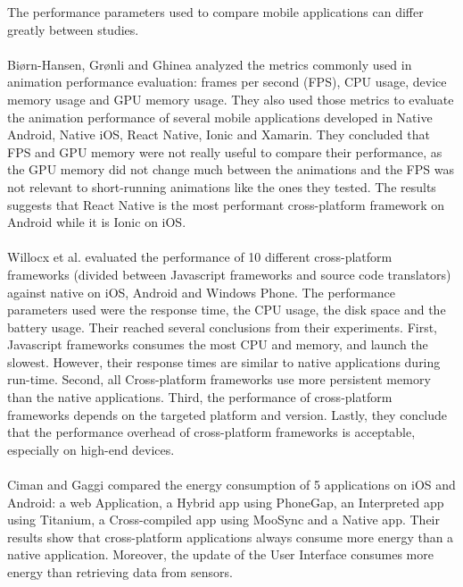 \documentclass{kththesis}
\begin{document}
The performance parameters used to compare mobile applications can differ greatly between studies. 

\paragraph{}
Biørn-Hansen, Grønli and Ghinea \cite{animation_performance} analyzed the metrics commonly used in animation performance evaluation: frames per second (FPS), CPU usage, device memory usage and GPU memory usage. They also used those metrics to evaluate the animation performance of several mobile applications developed in Native Android, Native iOS, React Native, Ionic and Xamarin. They concluded that FPS and GPU memory were not really useful to compare their performance, as the GPU memory did not change much between the animations and the FPS was not relevant to short-running animations like the ones they tested. The results suggests that React Native is the most performant cross-platform framework on Android while it is Ionic on iOS.
\paragraph{}
Willocx et al. \cite{willocx2016comparing} evaluated the performance of 10 different cross-platform frameworks (divided between Javascript frameworks and source code translators) against native on iOS, Android and Windows Phone. The performance parameters used were the response time, the CPU usage, the disk space and the battery usage. Their reached several conclusions from their experiments. First, Javascript frameworks consumes the most CPU and memory, and launch the slowest. However, their response times are similar to native applications during run-time. Second, all Cross-platform frameworks use more persistent memory than the native applications. Third, the performance of cross-platform frameworks depends on the targeted platform and version. Lastly, they conclude that the performance overhead of cross-platform frameworks is acceptable, especially on high-end devices. 

\paragraph{}
Ciman and Gaggi \cite{ciman2017empirical} compared the energy consumption of 5 applications on iOS and Android: a web Application, a Hybrid app using PhoneGap, an Interpreted app using Titanium, a Cross-compiled app using MooSync and a Native app. Their results show that cross-platform applications always consume more energy than a native application. Moreover, the update of the User Interface consumes more energy than retrieving data from sensors. 
\end{document}
